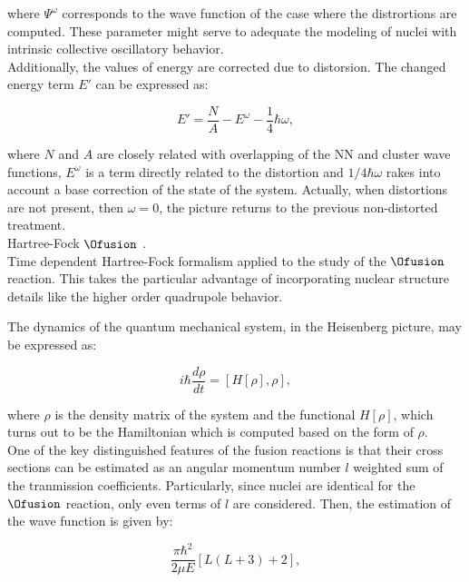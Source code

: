 \documentclass[openany]{book}
\begin{document}
where $ \Psi^{\omega}$ corresponds to the wave function of the case where the distrortions are computed. These parameter might serve to adequate the modeling of nuclei with intrinsic collective oscillatory behavior. \\

Additionally, the values of energy are corrected due to distorsion. The changed energy term $E'$ can be expressed as: 

\begin{equation}\label{eq:micro_multicluster_distortion_energy}
	E' = \frac{N}{A} - E^{\omega} - \frac{1}{4} \hbar \omega, 
\end{equation}

where $N$ and $A$ are closely related with overlapping of the NN and cluster wave functions, $E^{\omega}$ is a term directly related to the distortion and $1/4 \hbar \omega$ rakes into account a base correction of the state of the system. Actually, when distortions are not present, then $\omega = 0$, the picture returns to the previous non-distorted treatment. \\ 

Hartree-Fock $\Ofusion$ \cite{simenel_keser_umar_oberacker_2013}. \\

Time dependent Hartree-Fock formalism applied to the study of the $\Ofusion$ reaction. This takes the particular advantage of incorporating nuclear structure details like the higher order quadrupole behavior.

The dynamics of the quantum mechanical system, in the Heisenberg picture, may be expressed as:  

\begin{equation}\label{micro_TDHF_evolution}
	i\hbar \frac{d\rho}{dt} = [H[\rho], \rho],
\end{equation}

where $\rho$ is the density matrix of the system and the functional $H[\rho]$, which turns out to be the Hamiltonian which is computed based on the form of $\rho$. \\

One of the key distinguished features of the fusion reactions is that their cross sections can be estimated as an angular momentum number $l$ weighted sum of the tranmission coefficients. Particularly, since nuclei are identical for the $\Ofusion$ reaction, only even terms of $l$ are considered. Then, the estimation of the wave function is given by: 

\begin{equation}
	\frac{\pi\hbar^2}{2\mu E}  [L (L + 3 ) + 2],
\end{equation}
\end{document}
